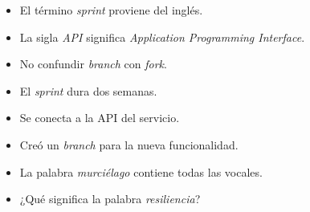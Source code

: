         \begin{itemize}
            \item El término \textit{sprint} proviene del inglés.
            
            \item La sigla \textit{API} significa \textit{Application Programming Interface}.
            
            \item No confundir \textit{branch} con \textit{fork}.
            
            
            
            \item El \textit{sprint} dura dos semanas.
            
            \item Se conecta a la API del servicio.
            
            \item Creó un \textit{branch} para la nueva funcionalidad.
            
            \item La palabra \textit{murciélago} contiene todas las vocales.
            
            \item ¿Qué significa la palabra \textit{resiliencia}?
            

\end{itemize}
